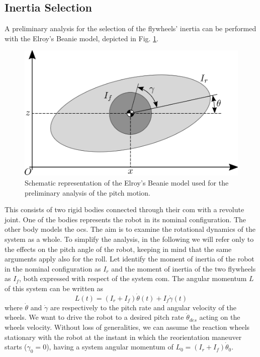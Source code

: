 \documentclass[journal,letterpaper]{IEEEtran}
\begin{document}
\subsection{Inertia Selection}
A preliminary analysis for the selection of the flywheels' inertia can be performed with the Elroy's Beanie model, depicted in Fig. \ref{fig:elroy-beanie}.
\begin{figure}
	\centering
	\includegraphics[width=.7\linewidth]{figures/elroys-beanie.eps}
	\caption{Schematic representation of the Elroy's Beanie model used for the preliminary analysis of the pitch motion.}
	\label{fig:elroy-beanie}
\end{figure} 
This consists of two rigid bodies connected through their \acrshort{com} with a revolute joint. One of the bodies represents the robot in its nominal configuration. The other body models the \acrshort{ocs}. The aim is to examine the rotational dynamics of the system as a whole. To simplify the analysis, in the following we will refer only to the effects on the pitch angle of the robot, keeping in mind that the same arguments apply also for the roll. Let identify the moment of inertia of the robot in the nominal configuration as $I_r$ and the moment of inertia of the two flywheels as $I_f$, both expressed with respect of the system \acrshort{com}.
The angular momentum $L$ of this system can be written as
\begin{equation}\label{eq:ang_mom_elroy}
L(t) = \left(I_r + I_{f}\right)\dot{\theta}(t) + I_{f}\dot{\gamma}(t)
\end{equation}
where $\dot{\theta}$ and $\dot{\gamma}$ are respectively to the pitch rate and angular velocity of the wheels. We want to drive the robot to a desired pitch rate $\dot{\theta}_{des}$ acting on the wheels velocity.
Without loss of generalities, we can assume the reaction wheels stationary with the robot at the instant in which the reorientation maneuver starts ($\gamma_0 = 0$), having a system angular momentum of $L_0 = \left(I_r + I_{f}\right)\dot{\theta}_0$.
\end{document}
